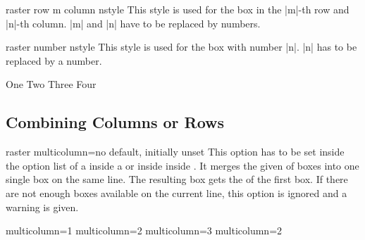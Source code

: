 \begin{docTcbKey}[][doc new=2014-11-10]{raster row m column n}{}{style}
This style is used for the box in the
|m|-th row and |n|-th column.
|m| and |n| have to be replaced by numbers.
\end{docTcbKey}


\begin{docTcbKey}[][doc new=2014-11-10]{raster number n}{}{style}
This style is used for the box with number |n|.
|n| has to be replaced by a number.
\begin{dispExample}
\begin{tcbitemize}[size=small,colframe=red!50!black,colback=red!10!white,
  raster number 4/.style={colframe=blue!50!black,colback=blue!10!white}]
  \tcbitem One
  \tcbitem Two
  \tcbitem Three
  \tcbitem Four
\end{tcbitemize}
\end{dispExample}
\end{docTcbKey}


\clearpage
\subsection{Combining Columns or Rows}\label{subsec:raster_multicolrow}

\begin{docTcbKey}[][doc new=2016-02-19]{raster multicolumn}{=}{no default, initially unset}
  This option has to be set inside the option list of a 
  inside a  or inside  inside .
  It merges the given  of boxes into one single box
  on the same line. The resulting box gets the 
  of the first box.
  If there are not enough boxes available on the current line, this option
  is ignored and a warning is given.

\begin{dispExample}
\begin{tcbitemize}[raster equal height=rows,raster columns=3,
  title=\thetcbrasternum,colframe=red!50!black,colback=red!10!white]
\tcbitem[colframe=blue!50!black,colback=blue!10!white,raster multicolumn=1]
  multicolumn=1
\tcbitem
\tcbitem
\tcbitem[colframe=blue!50!black,colback=blue!10!white,raster multicolumn=2]
  multicolumn=2
\tcbitem
\tcbitem[colframe=blue!50!black,colback=blue!10!white,raster multicolumn=3]
  multicolumn=3
\tcbitem
\tcbitem[colframe=blue!50!black,colback=blue!10!white,raster multicolumn=2]
  multicolumn=2
\end{tcbitemize}
\end{dispExample}
\end{docTcbKey}


